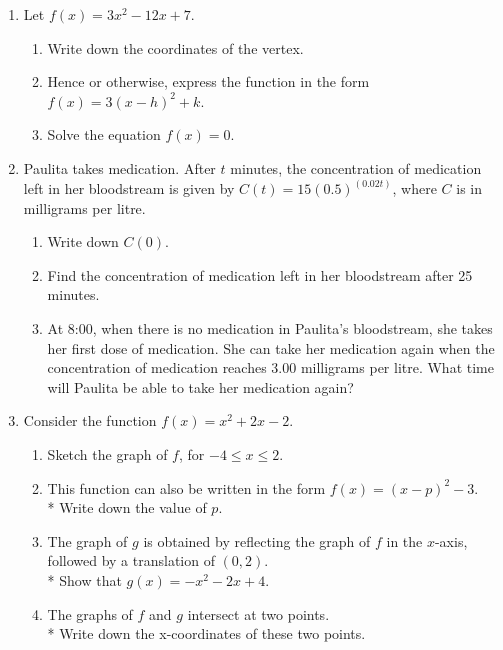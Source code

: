 \documentclass[]{book}
\begin{document}
\begin{enumerate}
\newpage
\noindent BECA / Huson / 11.1 IB Math SL \hspace{2in} Name:\\*
29 November 2017
\begin{center}
{\Large Trimester Exam: Function operations, quadratics, exponentials}\\
\textit{Answer separately on lined paper unless otherwise instructed.}
\end{center}

\subsection*{Part 2: Graphing calculators may be used on this section.}

\item Let $f(x)=3x^2-12x+7$.
\begin{enumerate}
    \item Write down the coordinates of the vertex.
    \item Hence or otherwise, express the function in the form $f(x)=3(x-h)^2 +k$.
    \item Solve the equation  $f(x)=0$.
\end{enumerate}

\item Paulita takes medication. After $t$ minutes, the concentration of medication left in her bloodstream is given by $\displaystyle C(t)=15(0.5)^{(0.02t)}$, where $C$ is in milligrams per litre.
\begin{enumerate}
    \item Write down $C(0)$.
    \item Find the concentration of medication left in her bloodstream after 25 minutes.
    \item At 8:00, when there is no medication in Paulita's bloodstream, she takes her first dose of medication. She can take her medication again when the concentration of medication reaches 3.00 milligrams per litre. What time will Paulita be able to take her medication again?
\end{enumerate}

\newpage
\item Consider the function $f(x)=x^2+2x-2$.
\begin{enumerate}
    \item Sketch the graph of $f$, for $-4 \leq x \leq 2$.
    \item This function can also be written in the form $f(x)=(x-p)^2 -3$.\\* 
    Write down the value of $p$.
    \item The graph of $g$ is obtained by reflecting the graph of $f$ in the $x$-axis, followed by a translation of $(0, 2)$.\\* Show that $g(x)=-x^2-2x+4$.
    \item The graphs of $f$ and $g$ intersect at two points.\\*
    Write down the x-coordinates of these two points.
\end{enumerate}


\end{enumerate}
\end{document}
